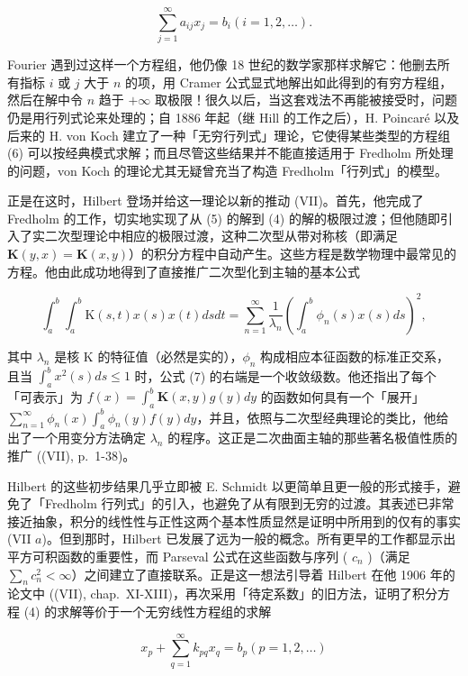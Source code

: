 \[
\sum_ {j = 1} ^ {\infty} a _ {i j} x _ {j} = b _ {i} (i = 1, 2, \dots).\tag{6}
\]

Fourier 遇到过这样一个方程组，他仍像 18 世纪的数学家那样求解它：他删去所有指标 \(i\) 或 \(j\) 大于 \(n\) 的项，用 Cramer 公式显式地解出如此得到的有穷方程组，然后在解中令 \(n\) 趋于 \(+\infty\) 取极限！很久以后，当这套戏法不再能被接受时，问题仍是用行列式论来处理的；自 1886 年起（继 Hill 的工作之后），H. Poincaré 以及后来的 H. von Koch 建立了一种「无穷行列式」理论，它使得某些类型的方程组 (6) 可以按经典模式求解；而且尽管这些结果并不能直接适用于 Fredholm 所处理的问题，von Koch 的理论尤其无疑曾充当了构造 Fredholm「行列式」的模型。

正是在这时，Hilbert 登场并给这一理论以新的推动 (VII)。首先，他完成了 Fredholm 的工作，切实地实现了从 (5) 的解到 (4) 的解的极限过渡；但他随即引入了实二次型理论中相应的极限过渡，这种二次型从带对称核（即满足 \(\mathbf{K}(y,x)=\mathbf{K}(x,y)\)）的积分方程中自动产生。这些方程是数学物理中最常见的方程。他由此成功地得到了直接推广二次型化到主轴的基本公式

\[
\int_ {a} ^ {b} \int_ {a} ^ {b} \mathrm{K} (s, t) x (s) x (t) d s d t = \sum_ {n = 1} ^ {\infty} \frac {1}{\lambda_ {n}} \left(\int_ {a} ^ {b} \phi_ {n} (s) x (s) d s\right) ^ {2},\tag{7}
\]

其中 \(\lambda_{n}\) 是核 K 的特征值（必然是实的），\(\phi_{n}\) 构成相应本征函数的标准正交系，且当 \(\int_{a}^{b} x^{2}(s) ds \leqslant 1\) 时，公式 (7) 的右端是一个收敛级数。他还指出了每个「可表示」为 \(f(x) = \int_{a}^{b} \mathbf{K}(x, y) g(y) dy\) 的函数如何具有一个「展开」 \(\sum_{n=1}^{\infty} \phi_{n}(x) \int_{a}^{b} \phi_{n}(y) f(y) dy\)，并且，依照与二次型经典理论的类比，他给出了一个用变分方法确定 \(\lambda_{n}\) 的程序。这正是二次曲面主轴的那些著名极值性质的推广 ((VII), p.~1-38)。

Hilbert 的这些初步结果几乎立即被 E. Schmidt 以更简单且更一般的形式接手，避免了「Fredholm 行列式」的引入，也避免了从有限到无穷的过渡。其表述已非常接近抽象，积分的线性性与正性这两个基本性质显然是证明中所用到的仅有的事实 (VII \(a\))。但到那时，Hilbert 已发展了远为一般的概念。所有更早的工作都显示出平方可积函数的重要性，而 Parseval 公式在这些函数与序列 ( \(c_n\) )（满足 \(\sum_{n} c_n^2 < \infty\)）之间建立了直接联系。正是这一想法引导着 Hilbert 在他 1906 年的论文中 ((VII), chap.~XI-XIII)，再次采用「待定系数」的旧方法，证明了积分方程 (4) 的求解等价于一个无穷线性方程组的求解

\[
x _ {p} + \sum_ {q = 1} ^ {\infty} k _ {p q} x _ {q} = b _ {p} (p = 1, 2, \dots)\tag{8}
\]

